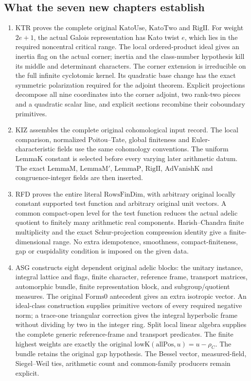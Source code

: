 \subsection{What the seven new chapters establish}

\begin{enumerate}
\item KTR proves the complete original \(\mathrm{KatoUse}\),
\(\mathrm{KatoTwo}\) and \(\mathrm{RigII}\). For weight
\(2e+1\), the actual Galois representation has Kato twist \(e\),
which lies in the required noncentral critical range. The local
ordered-product ideal gives an inertia flag on the actual corner;
inertia and the class-number hypothesis kill its middle and determinant
characters. The corner extension is irreducible on the full infinite
cyclotomic kernel. Its quadratic base change has the exact symmetric
polarization required for the adjoint theorem. Explicit projections
decompose all nine coordinates into the corner adjoint, two rank-two
pieces and a quadratic scalar line, and explicit sections recombine
their coboundary primitives.

\item KIZ assembles the complete original cohomological input record.
The local comparison, normalized Poitou--Tate, global finiteness and
Euler-characteristic fields use the same cohomology conventions.
The uniform \(\mathrm{LemmaK}\) constant is selected before every
varying later arithmetic datum. The exact \(\mathrm{LemmaM}\),
\(\mathrm{LemmaM'}\), \(\mathrm{LemmaP}\), \(\mathrm{RigII}\),
\(\mathrm{AdVanishK}\) and congruence-integer fields are then inserted.

\item RFD proves the entire literal \(\mathrm{RowsFinDim}\), with
arbitrary original locally constant supported test function and
arbitrary original unit vectors. A common compact-open level for the
test function reduces the actual adelic quotient to finitely many
arithmetic real components. Harish--Chandra finite multiplicity and
the exact Schur-projection compression identity give a finite-dimensional
range. No extra idempotence, smoothness, compact-finiteness, gap or
cuspidality condition is imposed on the given data.

\item ASG constructs eight dependent original adelic blocks:
the unitary instance, integral lattice and flags, finite character,
reference frame, transport matrices, automorphic bundle, finite
representation block, and subgroup/quotient measures.
The original \(\mathrm{Forms0}\) antecedent gives an extra
isotropic vector. An ideal-class construction supplies primitive
vectors of every required negative norm; a trace-one triangular
correction gives the integral hyperbolic frame without dividing by two
in the integer ring. Split local linear algebra supplies the complete
generic reference-frame and transport predicates.
The finite highest weights are exactly the original
\(\mathrm{lowK}(\mathrm{allPos},u)=u-\rho_C\).
The bundle retains the original gap hypothesis. The Bessel vector,
measured-field, Siegel--Weil ties, arithmetic count and common-family
producers remain explicit.


\end{enumerate}
